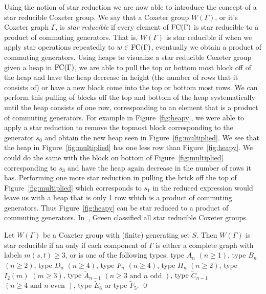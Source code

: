Using the notion of star reduction we are now able to introduce the concept of a star reducible Coxeter group. We say that a Coxeter group $W(\Gamma)$, or it's Coxeter graph $\Gamma$, is \emph{star reducible} if every element of $\mathrm{FC}(\Gamma)$ is star reducible to a product of commuting generators. That is, $W(\Gamma)$ is star reducible if when we apply star operations repeatedly to $w \in \mathrm{FC}(\Gamma)$, eventually we obtain a product of commuting generators. Using heaps to visualize a star reducible Coxeter group given a heap in $\mathrm{FC}(\Gamma)$, we are able to pull the top or bottom most block off of the heap and have the heap decrease in height (the number of rows that it consists of) or have a new block come into the top or bottom most rows. We can perform this pulling of blocks off the top and bottom of the heap systematically until the heap consists of one row, corresponding to an element that is a product of commuting generators. For example in Figure~\ref{fig:heapy}, we were able to apply a star reduction to remove the topmost block corresponding to the generator $s_0$ and obtain the new heap seen in Figure~\ref{fig:multiplied}. We see that the heap in Figure~\ref{fig:multiplied} has one less row than Figure~\ref{fig:heapy}. We could do the same with the block on bottom of Figure~\ref{fig:multiplied} corresponding to $s_3$ and have the heap again decrease in the number of rows it has. Performing one more star reduction in pulling the brick off the top of Figure~\ref{fig:multiplied} which corresponds to $s_1$ in the reduced expression would leave us with a heap that is only 1 row which is a product of commuting generators. Thus Figure~\ref{fig:heapy} can be star reduced to a product of commuting generators.  In~\cite{Green2006a}, Green classified all star reducible Coxeter groups. 
\begin{theorem}
	Let $W(\Gamma)$ be a Coxeter group with (finite) generating set $S$. Then $W(\Gamma)$ is star reducible if an only if each component of $\Gamma$ is either a complete graph with labels $m(s,t)\geq 3$, or is one of the following types: type $A_n$ $(n \geq 1)$, type $B_n$ $(n \geq 2)$, type $D_n$ $(n \geq 4)$, type $F_n$ $(n \geq 4)$, type $H_n$ $(n \geq 2)$, type $I_2(m)$ $(m \geq 3)$, type $\widetilde{A}_{n-1}$ $(n \geq 3 \textrm{ and } n \textrm{ odd })$, type $\widetilde{C}_{n-1}$ $(n\geq 4 \textrm{ and } n \textrm{ even })$, type $\widetilde{E}_6$ or type $\widetilde{F}_5$. \qed
\end{theorem}  

